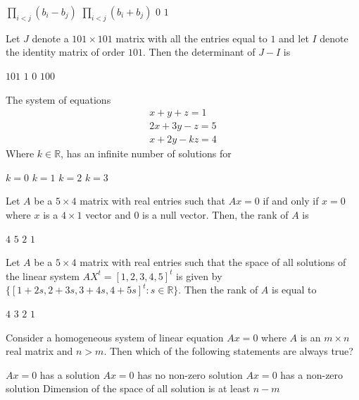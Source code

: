 \documentclass[10pt]{exam}
\newcommand{\R}{\ensuremath{\mathbb{R}}}
\begin{document}
\begin{questions}
\begin{oneparchoices}
\choice $\prod_{i<j}(b_i-b_j)$
\choice $\prod_{i<j}(b_i+b_j)$
\choice $0$
\choice $1$
\end{oneparchoices}


\question
Let $J$ denote a $101 \times 101 $ matrix with all the entries equal to $1$ and let $I$ denote the identity matrix of order $101$. Then the determinant of $J - I$ is 

\begin{oneparchoices}
\choice $101$
\choice $1$
\choice $0$
\choice $100$
\end{oneparchoices}


\question
The system of equations
\begin{align*}
x+y+z=1\\
2x+3y-z=5\\
x+2y-kz=4
\end{align*}
Where $k\in \R$, has an infinite number of solutions for 

\begin{oneparchoices}
\choice $k=0$
\choice $k=1$
\choice $k=2$
\choice $k=3$
\end{oneparchoices}
\question 
Let $A$ be a $5\times 4$ matrix with real entries such that $Ax=0$ if and only if $x=0$ where $x$ is a $4\times 1$ vector and $0$ is
a null vector. Then, the rank of $A$ is

\begin{oneparchoices}
\choice $4$
\choice $5$
\choice $2$
\choice $1$
\end{oneparchoices}

\question
Let $A$ be a $5\times 4$ matrix with real entries such that the space of all solutions of the linear system $AX^t=[1,2,3,4,5]^t$ is
given by $\{[1+2s,2+3s,3+4s,4+5s]^t:s \in \R\}$. Then the rank of $A$ is equal to

\begin{oneparchoices}
\choice $4$
\choice $3$
\choice $2$
\choice $1$
\end{oneparchoices}

\question 
Consider a homogeneous system of linear equation $Ax = 0$ where $A$ is an $m \times n $ real matrix and $n>m$. Then which of the following statements are always true?

\begin{checkboxes}
\choice $Ax = 0$ has a solution 
\choice $Ax = 0$ has no non-zero  solution 
\choice $Ax = 0$ has a non-zero solution
\choice Dimension of the space of all solution is at least $n-m$
\end{checkboxes}


\end{questions}
\end{document}

